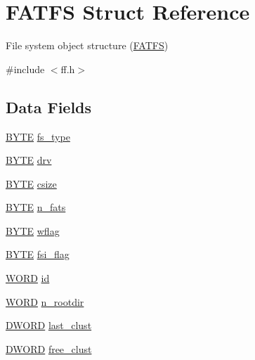 \hypertarget{structFATFS}{\section{F\-A\-T\-F\-S Struct Reference}
\label{structFATFS}
}


File system object structure (\hyperlink{structFATFS}{F\-A\-T\-F\-S})  




{\ttfamily \#include $<$ff.\-h$>$}

\subsection*{Data Fields}
\begin{DoxyCompactItemize}
\item 
\hyperlink{integer_8h_a4ae1dab0fb4b072a66584546209e7d58}{B\-Y\-T\-E} \hyperlink{structFATFS_add27d97babe807b573eac98a71dc4ae5}{fs\-\_\-type}
\item 
\hyperlink{integer_8h_a4ae1dab0fb4b072a66584546209e7d58}{B\-Y\-T\-E} \hyperlink{structFATFS_a6a791560e2687e8b1569bfce61208d2d}{drv}
\item 
\hyperlink{integer_8h_a4ae1dab0fb4b072a66584546209e7d58}{B\-Y\-T\-E} \hyperlink{structFATFS_a504a1175f6dcc9a854b9da94463bd108}{csize}
\item 
\hyperlink{integer_8h_a4ae1dab0fb4b072a66584546209e7d58}{B\-Y\-T\-E} \hyperlink{structFATFS_a56716c7e7ac10cf46e73ffb2a2e9b545}{n\-\_\-fats}
\item 
\hyperlink{integer_8h_a4ae1dab0fb4b072a66584546209e7d58}{B\-Y\-T\-E} \hyperlink{structFATFS_a647e43c9ccae94b7274793d1909897de}{wflag}
\item 
\hyperlink{integer_8h_a4ae1dab0fb4b072a66584546209e7d58}{B\-Y\-T\-E} \hyperlink{structFATFS_a84e9cdc5a6a8e33ea7ec192058abf161}{fsi\-\_\-flag}
\item 
\hyperlink{integer_8h_a197942eefa7db30960ae396d68339b97}{W\-O\-R\-D} \hyperlink{structFATFS_a417095d7c20d56d417dc0998e0dd5a5c}{id}
\item 
\hyperlink{integer_8h_a197942eefa7db30960ae396d68339b97}{W\-O\-R\-D} \hyperlink{structFATFS_a189a00aa038044ffad0fc7f7dcf2aae1}{n\-\_\-rootdir}
\item 
\hyperlink{integer_8h_ad342ac907eb044443153a22f964bf0af}{D\-W\-O\-R\-D} \hyperlink{structFATFS_ad315def289218e26ab78ff90fde700d1}{last\-\_\-clust}
\item 
\hyperlink{integer_8h_ad342ac907eb044443153a22f964bf0af}{D\-W\-O\-R\-D} \hyperlink{structFATFS_a5fb49e6ac511bd97eaffdd636d0e4165}{free\-\_\-clust}

\end{DoxyCompactItemize}

